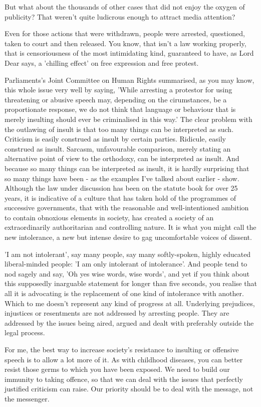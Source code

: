 \documentclass[11pt, a4paper]{article}
\begin{document}
But what about the thousands of other cases that did not enjoy the oxygen of publicity? That weren't quite ludicrous enough to attract media attention?

Even for those actions that were withdrawn, people were arrested, questioned, taken to court and then released.
You know, that isn't a law working properly, that is censoriousness of the most intimidating kind, guaranteed to have, as Lord Dear says, a 'chilling effect' on free expression and free protest.

Parliaments's Joint Committee on Human Rights summarised, as you may know, this whole issue very well by saying, 'While arresting a protestor for using threatening or abusive speech may, depending on the cirumstances, be a proportionate response, we do not think that language or behaviour that is merely insulting should ever be criminalised in this way.'
The clear problem with the outlawing of insult is that too many things can be interpreted as such. Criticism is easily construed as insult by certain parties. Ridicule, easily construed as insult. Sarcasm, unfavourable comparison, merely stating an alternative point of view to the orthodoxy, can be interpreted as insult.
And because so many things can be interpreted as insult, it is hardly surprising that so many things have been - as the examples I've talked about earlier - show.
Although the law under discussion has been on the statute book for over 25 years, it is indicative of a culture that has taken hold of the programmes of successive governments, that with the reasonable and well-intentioned ambition to contain obnoxious elements in society, has created a society of an extraordinarily authoritarian and controlling nature.
It is what you might call the new intolerance, a new but intense desire to gag uncomfortable voices of dissent.

'I am not intolerant', say many people, say many softly-spoken, highly educated liberal-minded people: 'I am only intolerant of intolerance'. And people tend to nod sagely and say, 'Oh yes wise words, wise words', and yet if you think about this supposedly inarguable statement for longer than five seconds, you realise that all it is advocating is the replacement of one kind of intolerance with another.
Which to me doesn't represent any kind of progress at all. Underlying prejudices, injustices or resentments are not addressed by arresting people. They are addressed by the issues being aired, argued and dealt with preferably outside the legal process.

For me, the best way to increase society's resistance to insulting or offensive speech is to allow a lot more of it. As with childhood diseases, you can better resist those germs to which you have been exposed. We need to build our immunity to taking offence, so that we can deal with the issues that perfectly justified criticism can raise. Our priority should be to deal with the message, not the messenger.
\end{document}
